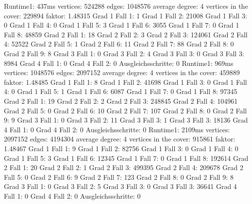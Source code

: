 \documentclass[12pt,onecolumn, notitlepage]{scrartcl}
\begin{document}
 Runtime1: 437ms\newline \newline 
vertices: 524288 edges: 1048576 average degree: 4 \newline 
vertices in the cover: 229894 faktor: 1.48315\newline 
Grad 1 Fall 1: 1 Grad 1 Fall 2: 21008 Grad 1 Fall 3: 0 Grad 1 Fall 4: 0 Grad 1 Fall 5: 3 Grad 1 Fall 6: 3055 Grad 1 Fall 7: 0 Grad 1 Fall 8: 48859\newline 
Grad 2 Fall 1: 18 Grad 2 Fall 2: 3 Grad 2 Fall 3: 124061 Grad 2 Fall 4: 52522 Grad 2 Fall 5: 1 Grad 2 Fall 6: 11 Grad 2 Fall 7: 88 Grad 2 Fall 8: 0 Grad 2 Fall 9: 8\newline 
Grad 3 Fall 1: 0 Grad 3 Fall 2: 4 Grad 3 Fall 3: 0 Grad 3 Fall 3: 8984 Grad 4 Fall 1: 0 Grad 4 Fall 2: 0 Ausgleichsschritte: 0\newline
 Runtime1: 969ms\newline \newline 
vertices: 1048576 edges: 2097152 average degree: 4 \newline 
vertices in the cover: 459889 faktor: 1.48485\newline 
Grad 1 Fall 1: 8 Grad 1 Fall 2: 41698 Grad 1 Fall 3: 0 Grad 1 Fall 4: 0 Grad 1 Fall 5: 1 Grad 1 Fall 6: 6087 Grad 1 Fall 7: 0 Grad 1 Fall 8: 97345\newline 
Grad 2 Fall 1: 19 Grad 2 Fall 2: 2 Grad 2 Fall 3: 248845 Grad 2 Fall 4: 104961 Grad 2 Fall 5: 0 Grad 2 Fall 6: 10 Grad 2 Fall 7: 107 Grad 2 Fall 8: 0 Grad 2 Fall 9: 9\newline 
Grad 3 Fall 1: 0 Grad 3 Fall 2: 11 Grad 3 Fall 3: 1 Grad 3 Fall 3: 18136 Grad 4 Fall 1: 0 Grad 4 Fall 2: 0 Ausgleichsschritte: 0\newline 
 Runtime1: 2109ms\newline \newline 
vertices: 2097152 edges: 4194304 average degree: 4 \newline 
vertices in the cover: 915861 faktor: 1.48467\newline 
Grad 1 Fall 1: 9 Grad 1 Fall 2: 82756 Grad 1 Fall 3: 0 Grad 1 Fall 4: 0 Grad 1 Fall 5: 3 Grad 1 Fall 6: 12345 Grad 1 Fall 7: 0 Grad 1 Fall 8: 192614\newline 
Grad 2 Fall 1: 20 Grad 2 Fall 2: 1 Grad 2 Fall 3: 499395 Grad 2 Fall 4: 209678 Grad 2 Fall 5: 0 Grad 2 Fall 6: 9 Grad 2 Fall 7: 123 Grad 2 Fall 8: 0 Grad 2 Fall 9: 8\newline 
Grad 3 Fall 1: 0 Grad 3 Fall 2: 5 Grad 3 Fall 3: 0 Grad 3 Fall 3: 36641 Grad 4 Fall 1: 0 Grad 4 Fall 2: 0 Ausgleichsschritte: 0\newline 
\end{document}
